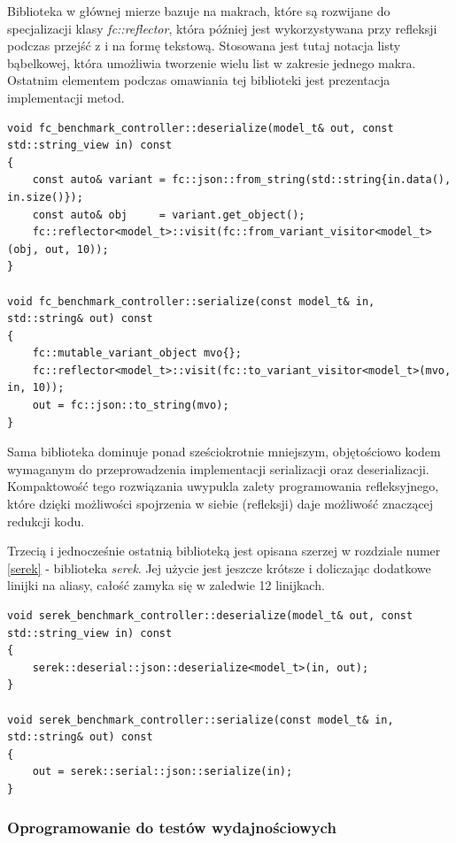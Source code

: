 \documentclass[12pt]{article}
\newcommand{\n}{\newline}
\begin{document}
{{{				Biblioteka w głównej mierze bazuje na makrach, które są rozwijane do specjalizacji klasy {\it fc::reflector}, która później jest
				wykorzystywana przy refleksji podczas przejść z i na formę tekstową. Stosowana jest tutaj notacja listy bąbelkowej, która umożliwia
				tworzenie wielu list w zakresie jednego makra. Ostatnim elementem podczas omawiania tej biblioteki jest prezentacja implementacji metod.\n

				\begin{lstlisting}[frame=single]
void fc_benchmark_controller::deserialize(model_t& out, const std::string_view in) const
{
	const auto& variant = fc::json::from_string(std::string{in.data(), in.size()});
	const auto& obj	    = variant.get_object();
	fc::reflector<model_t>::visit(fc::from_variant_visitor<model_t>(obj, out, 10));
}

void fc_benchmark_controller::serialize(const model_t& in, std::string& out) const
{
	fc::mutable_variant_object mvo{};
	fc::reflector<model_t>::visit(fc::to_variant_visitor<model_t>(mvo, in, 10));
	out = fc::json::to_string(mvo);
}
				\end{lstlisting}

				Sama biblioteka dominuje ponad sześciokrotnie mniejszym, objętościowo kodem wymaganym do przeprowadzenia implementacji
				serializacji oraz deserializacji. Kompaktowość tego rozwiązania uwypukla zalety programowania refleksyjnego, które dzięki
				możliwości spojrzenia w siebie (refleksji) daje możliwość znaczącej redukcji kodu.\n

				Trzecią i jednocześnie ostatnią biblioteką jest opisana szerzej w rozdziale numer \ref{serek} - biblioteka {\it serek}.
				Jej użycie jest jeszcze krótsze i doliczając dodatkowe linijki na aliasy, całość zamyka się w zaledwie 12 linijkach.

				\begin{lstlisting}[frame=single]
void serek_benchmark_controller::deserialize(model_t& out, const std::string_view in) const
{
	serek::deserial::json::deserialize<model_t>(in, out);
}

void serek_benchmark_controller::serialize(const model_t& in, std::string& out) const
{
	out = serek::serial::json::serialize(in);
}
				\end{lstlisting}
			}

			{
				\subsubsection{Oprogramowanie do testów wydajnościowych}
			}

}}
\end{document}

